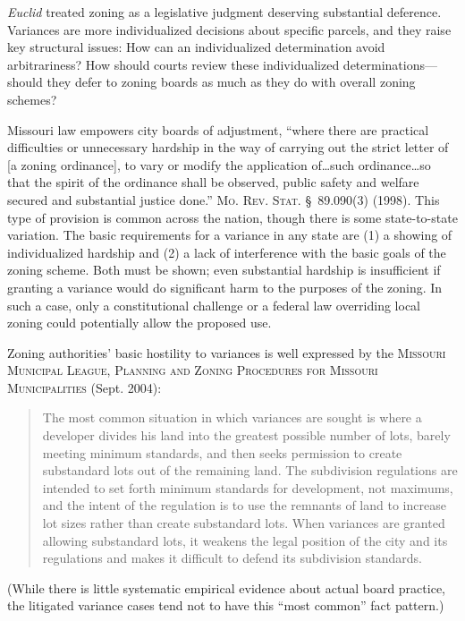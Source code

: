\textit{Euclid} treated zoning as a legislative judgment deserving substantial
deference. Variances are more individualized decisions about specific parcels,
and they raise key structural issues: How can an individualized determination
avoid arbitrariness? How should courts review these individualized
determinations---should they defer to zoning boards as much as they do with
overall zoning schemes?

Missouri law empowers city boards of adjustment, ``where there are practical
difficulties or unnecessary hardship in the way of carrying out the strict
letter of [a zoning ordinance], to vary or modify the application of\ldots such
ordinance\ldots so that the spirit of the ordinance shall be observed, public
safety and welfare secured and substantial justice done.'' \textsc{Mo. Rev.
Stat.} \S~89.090(3) (1998). This type of provision is common across the nation,
though there is some state-to-state variation. The basic requirements for a
variance in any state are (1) a showing of individualized hardship and (2) a
lack of interference with the basic goals of the zoning scheme. Both must be
shown; even substantial hardship is insufficient if granting a variance would do
significant harm to the purposes of the zoning. In such a case, only a
constitutional challenge or a federal law overriding local zoning could
potentially allow the proposed use.

Zoning authorities' basic hostility to variances is well expressed by the
\textsc{Missouri Municipal League, Planning and Zoning Procedures for Missouri
Municipalities} (Sept. 2004): 
\begin{quote}
The most common situation in which variances are sought is where a developer
divides his land into the greatest possible number of lots, barely meeting
minimum standards, and then seeks permission to create substandard lots out of
the remaining land. The subdivision regulations are intended to set forth
minimum standards for development, not maximums, and the intent of the
regulation is to use the remnants of land to increase lot sizes rather than
create substandard lots. When variances are granted allowing substandard lots,
it weakens the legal position of the city and its regulations and makes it
difficult to defend its subdivision standards.
\end{quote}

(While there is little systematic empirical evidence about actual board
practice, the litigated variance cases tend not to have this ``most common''
fact pattern.)

